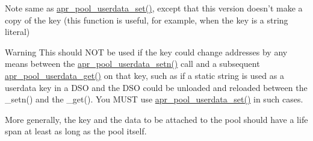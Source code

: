 \begin{DoxyNote}{Note}
same as \hyperlink{group__apr__pools_ga78d1aa2d9fa842d83eaffccb0f0c0c5c}{apr\-\_\-pool\-\_\-userdata\-\_\-set()}, except that this version doesn't make a copy of the key (this function is useful, for example, when the key is a string literal) 
\end{DoxyNote}
\begin{DoxyWarning}{Warning}
This should N\-O\-T be used if the key could change addresses by any means between the \hyperlink{group__apr__pools_ga435644c493dc5b10d80c4b99b8cd4589}{apr\-\_\-pool\-\_\-userdata\-\_\-setn()} call and a subsequent \hyperlink{group__apr__pools_gaf930f1fad2cf92a2432c0814c8a0b86f}{apr\-\_\-pool\-\_\-userdata\-\_\-get()} on that key, such as if a static string is used as a userdata key in a D\-S\-O and the D\-S\-O could be unloaded and reloaded between the \-\_\-setn() and the \-\_\-get(). You M\-U\-S\-T use \hyperlink{group__apr__pools_ga78d1aa2d9fa842d83eaffccb0f0c0c5c}{apr\-\_\-pool\-\_\-userdata\-\_\-set()} in such cases. 

More generally, the key and the data to be attached to the pool should have a life span at least as long as the pool itself. 
\end{DoxyWarning}
